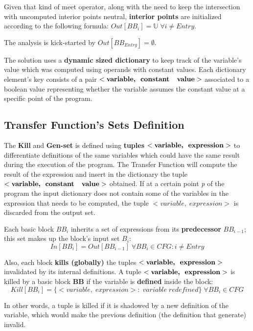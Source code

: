 \documentclass[a4paper,12pt,numbers=noenddot]{scrreprt}
\begin{document}
        Given that kind of meet operator, along with the need to keep the intersection with uncomputed interior points neutral, \textbf{interior points} are initialized according to the following formula: $Out[BB_i] = \mathbb{U} \; \forall i \neq Entry$.
        
        The analysis is kick-started by $Out[BB_{Entry}] = \emptyset$.
        
        The solution uses a \textbf{dynamic sized dictionary} to keep track of the variable's value which was computed using operands with constant values. Each dictionary element's key consists of a pair $<\textbf{variable,\; constant \; value}>$ associated to a boolean value representing whether the variable assumes the constant value at a specific point of the program.
        
    \subsection*{Transfer Function's Sets Definition}

        The \textbf{Kill} and \textbf{Gen-set} is defined using \textbf{tuples} $<\textbf{variable,\; expression}>$ to differentiate definitions of the same variables which could have the same result during the execution of the program. The Transfer Function will compute the result of the expression and insert in the dictionary the tuple $<\textbf{variable,\; constant \; value}>$ obtained. If at a certain point \textit{p} of the program the input dictionary does not contain some of the variables in the expression that needs to be computed, the tuple $<variable,\; expression>$ is discarded from the output set. 
        
        Each basic block $BB_i$ inherits a set of expressions from its \textbf{predecessor} $BB_{i-1}$; this set makes up the block's input set $B_i$: $$In[BB_i] = Out[BB_{i-1}] \; \forall BB_i \in CFG : i \neq Entry$$
        
        Also, each block \textbf{kills (globally)} the tuples $<\textbf{variable,\; expression}>$ invalidated by its internal definitions. A tuple $<\textbf{variable,\; expression}>$ is killed by a basic block \textbf{BB} if the variable is \textbf{defined} inside the block: $$Kill[BB_i] = \{ <variable,\; expression> : \; variable \; redefined \} \; \forall BB_i \in CFG$$

        In other words, a tuple is killed if it is shadowed by a new definition of the variable, which would make the previous definition (the definition that generate) invalid.
\end{document}
